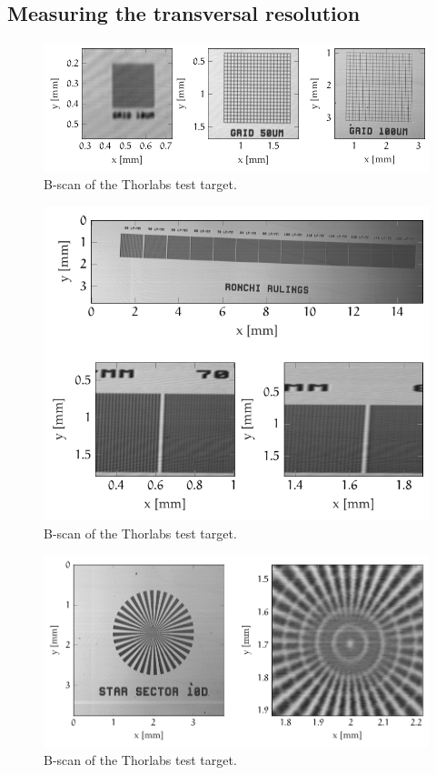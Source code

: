 \FloatBarrier
\subsection{Measuring the transversal resolution}
\begin{figure}[hbt]
	\centering
	\includegraphics[width=\linewidth]{gfx/ch4/axsun/target/grid}
	\caption{B-scan of the Thorlabs test target.}\label{fig:target-grid}
\end{figure}

\begin{figure}[hbt]
	\centering
	\includegraphics[width=1\linewidth]{gfx/ch4/axsun/target/ronchi}
	\caption{B-scan of the Thorlabs test target.}\label{fig:target-ronchi}
\end{figure}

\begin{figure}[hbt]
	\centering
	\includegraphics[width=1\linewidth]{gfx/ch4/axsun/target/star-sector}
	\caption{B-scan of the Thorlabs test target.}\label{fig:target-star}
\end{figure}

